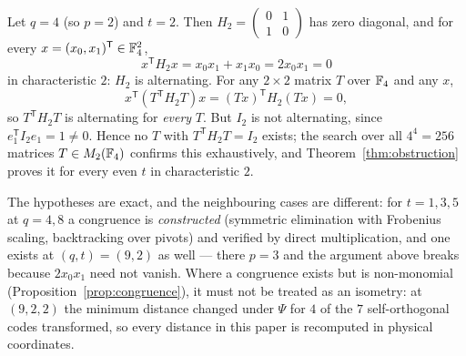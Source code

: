 \begin{example}[the characteristic-two obstruction, at $(q,t)=(4,2)$]
\label{ex:obstruction}
Let $q=4$ (so $p=2$) and $t=2$. Then $H_2=\begin{pmatrix}0&1\\1&0\end{pmatrix}$
has zero diagonal, and for every $x=(x_0,x_1)^{\mathsf T}\in\mathbb F_4^2$,
\[
  x^{\mathsf T}H_2x=x_0x_1+x_1x_0=2x_0x_1=0
\]
in characteristic $2$: $H_2$ is alternating. For any $2\times2$ matrix $T$ over
$\mathbb F_4$ and any $x$,
\[
  x^{\mathsf T}(T^{\mathsf T}H_2T)x=(Tx)^{\mathsf T}H_2(Tx)=0,
\]
so $T^{\mathsf T}H_2T$ is alternating for \emph{every} $T$. But $I_2$ is not
alternating, since $e_1^{\mathsf T}I_2e_1=1\ne0$. Hence no $T$ with
$T^{\mathsf T}H_2T=I_2$ exists; the search over all $4^4=256$ matrices
$T\in M_2(\mathbb F_4)$ confirms this exhaustively, and Theorem~\ref{thm:obstruction}
proves it for every even $t$ in characteristic $2$.

The hypotheses are exact, and the neighbouring cases are different: for
$t=1,3,5$ at $q=4,8$ a congruence is \emph{constructed} (symmetric elimination
with Frobenius scaling, backtracking over pivots) and verified by direct
multiplication, and one exists at $(q,t)=(9,2)$ as well --- there $p=3$ and the
argument above breaks because $2x_0x_1$ need not vanish. Where a congruence
exists but is non-monomial (Proposition~\ref{prop:congruence}), it must not
be treated as an isometry: at $(9,2,2)$ the minimum distance changed under
$\Psi$ for $4$ of the $7$ self-orthogonal codes transformed, so every
distance in this paper is
recomputed in physical coordinates.
\end{example}
